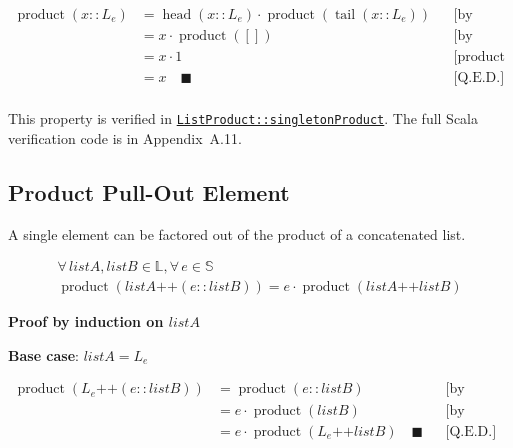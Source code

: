 \begin{equation*}
\begin{aligned}
\operatorname{product}(x :: L_e) &= \operatorname{head}(x :: L_e) \cdot \operatorname{product}(\operatorname{tail}(x :: L_e)) && \text{[by definition of product]} \\
&= x \cdot \operatorname{product}([]) && \text{[by definition of head and tail]} \\
&= x \cdot 1 && \text{[product of empty list is 1]} \\
&= x \quad \blacksquare && \text{[Q.E.D.]} \\
\end{aligned}
\end{equation*}

{\raggedright
This property is verified in
\href{https://github.com/thiagomata/prime-numbers/blob/list-article-v1.0.0/src/main/scala/v1/chapter3/list/properties/ListProduct.scala}{\texttt{ListProduct::\allowbreak singletonProduct}}.
The full Scala verification code is in Appendix~A.11.
\par}

\subsection{Product Pull-Out Element}

A single element can be factored out of the product of a concatenated
list.

\begin{gather*}
\forall\, listA, listB \in \mathbb{L}, \forall\, e \in \mathbb{S} \\
\operatorname{product}(listA \mathbin{\texttt{++}} (e :: listB)) = e \cdot \operatorname{product}(listA \mathbin{\texttt{++}} listB)
\end{gather*}

\textbf{Proof by induction on $listA$}\par\nopagebreak

\textbf{Base case}: $listA = L_e$\par\nopagebreak

\begin{equation*}
\begin{aligned}
\operatorname{product}(L_e \mathbin{\texttt{++}} (e :: listB)) &= \operatorname{product}(e :: listB) && \text{[by definition of append and cons]} \\
&= e \cdot \operatorname{product}(listB) && \text{[by definition of product]} \\
&= e \cdot \operatorname{product}(L_e \mathbin{\texttt{++}} listB) \quad \blacksquare && \text{[Q.E.D.]} \\
\end{aligned}
\end{equation*}

